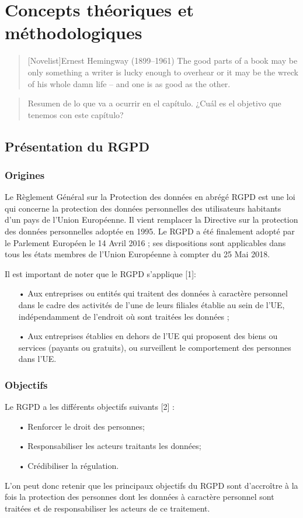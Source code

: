\chapter{Concepts théoriques et méthodologiques}

\begin{quotation}[Novelist]{Ernest Hemingway (1899--1961)}
The good parts of a book may be only something a writer is lucky enough to overhear or it may be the wreck of his whole damn life -- and one is as good as the other.
\end{quotation}

\begin{abstract}
Resumen de lo que va a ocurrir en el capítulo. ¿Cuál es el objetivo que tenemos con este capítulo?
\end{abstract}

\section{Présentation du RGPD}
\subsection{Origines}
Le Règlement Général sur la Protection des données en abrégé RGPD est une loi qui concerne la protection des données personnelles des utilisateurs habitants d’un pays de l’Union Européenne. Il vient remplacer la Directive sur la protection des données personnelles adoptée en 1995. Le RGPD a été finalement adopté par le Parlement Européen le 14 Avril 2016 ; ses dispositions sont applicables dans tous les états membres de l’Union Européenne à compter du 25 Mai 2018.

Il est important de noter que le RGPD s’applique [1]:
\begin{itemize}
   \item[•] Aux entreprises ou entités qui traitent des données à caractère personnel dans le cadre des activités de l’une de leurs filiales établie au sein de l’UE, indépendamment de l’endroit où sont traitées les données ;
   \item[•] Aux entreprises établies en dehors de l’UE qui proposent des biens ou services (payants ou gratuits), ou surveillent le comportement des personnes dans l’UE.
\end{itemize}

\subsection{Objectifs}
Le RGPD a les différents objectifs suivants [2] :
\begin{itemize}
   \item[•] Renforcer le droit des personnes;
   \item[•] Responsabiliser les acteurs traitants les données;
   \item[•] Crédibiliser la régulation.
\end{itemize}
L’on peut donc retenir que les principaux objectifs du RGPD sont d’accroître à la fois la protection des personnes dont les données à caractère personnel sont traitées et de responsabiliser les acteurs de ce traitement. 
